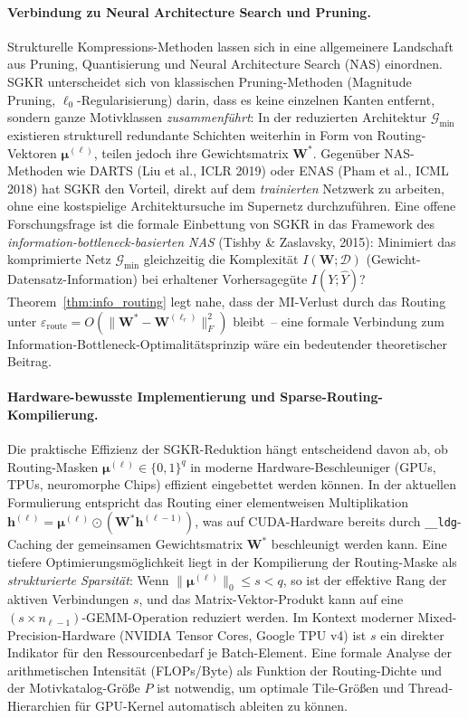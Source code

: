 ﻿\documentclass[12pt, a4paper, openany]{report}
\newcommand{\calG}{\mathcal{G}}
\newcommand{\calD}{\mathcal{D}}
\begin{document}
\paragraph{Verbindung zu Neural Architecture Search und Pruning.}
Strukturelle Kompres\-sions-Methoden lassen sich in eine allgemeinere Landschaft
aus Pruning, Quantisierung und Neural Architecture Search (NAS) einordnen.
SGKR unterscheidet sich von klassischen Pruning-Methoden (Magnitude Pruning,
$\ell_0$-Regularisierung) darin, dass es keine einzelnen Kanten entfernt,
sondern ganze Motivklassen \emph{zusammenführt}: In der reduzierten
Architektur $\calG_{\min}$ existieren strukturell redundante Schichten
weiterhin in Form von Routing-Vektoren $\bm{\mu}^{(\ell)}$, teilen jedoch
ihre Gewichtsmatrix $\bm{W}^*$.  Gegenüber NAS-Methoden wie DARTS
(Liu et al., ICLR 2019) oder ENAS (Pham et al., ICML 2018) hat SGKR den
Vorteil, direkt auf dem \emph{trainierten} Netzwerk zu arbeiten, ohne eine
kostspielige Architektursuche im Supernetz durchzuführen.  Eine offene
Forschungsfrage ist die formale Einbettung von SGKR in das Framework des
\emph{information-bottleneck-basierten NAS} (Tishby \& Zaslavsky, 2015):
Minimiert das komprimierte Netz $\calG_{\min}$ gleichzeitig die
Komplexität $I(\bm{W};\calD)$ (Gewicht-Datensatz-Information) bei erhaltener
Vorhersagegüte $I(Y;\hat{Y})$?  Theorem~\ref{thm:info_routing} legt nahe,
dass der MI-Verlust durch das Routing unter
$\varepsilon_{\mathrm{route}} = O(\|\bm{W}^* - \bm{W}^{(\ell_r)}\|_F^2)$
bleibt~-- eine formale Verbindung zum Information-Bottleneck-Optimalitätsprinzip
wäre ein bedeutender theoretischer Beitrag.

\paragraph{Hardware-bewusste Implementierung und Sparse-Routing-Kompilierung.}
Die praktische Effizienz der SGKR-Reduktion hängt entscheidend davon ab,
ob Routing-Masken $\bm{\mu}^{(\ell)} \in \{0,1\}^q$ in moderne Hardware-Beschleuniger
(GPUs, TPUs, neuromorphe Chips) effizient eingebettet werden können.  In der
aktuellen Formulierung entspricht das Routing einer elementweisen
Multiplikation $\bm{h}^{(\ell)} = \bm{\mu}^{(\ell)} \odot (\bm{W}^*
\bm{h}^{(\ell-1)})$, was auf CUDA-Hardware bereits durch
\texttt{\_\_ldg}-Caching der gemeinsamen Gewichtsmatrix $\bm{W}^*$
beschleunigt werden kann.  Eine tiefere Optimierungsmöglichkeit liegt in
der Kompilierung der Routing-Maske als \emph{strukturierte Sparsität}: Wenn
$\|\bm{\mu}^{(\ell)}\|_0 \leq s < q$, so ist der effektive Rang der aktiven
Verbindungen $s$, und das Matrix-Vektor-Produkt kann auf eine
$(s \times n_{\ell-1})$-GEMM-Operation reduziert werden.  Im Kontext moderner
Mixed-Precision-Hardware (NVIDIA Tensor Cores, Google TPU v4) ist $s$ ein
direkter Indikator für den Ressourcenbedarf je Batch-Element.  Eine formale
Analyse der arithmetischen Intensität (FLOPs/Byte) als Funktion der
Routing-Dichte und der Motivkatalog-Größe $P$ ist notwendig, um optimale
Tile-Größen und Thread-Hierarchien für GPU-Kernel automatisch ableiten zu
können.
\end{document}
